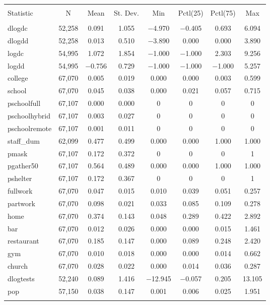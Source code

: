   \caption{} 
  \label{} 
\begin{tabular}{@{\extracolsep{5pt}}lccccccc} 
\\[-1.8ex]\hline 
\hline \\[-1.8ex] 
Statistic & \multicolumn{1}{c}{N} & \multicolumn{1}{c}{Mean} & \multicolumn{1}{c}{St. Dev.} & \multicolumn{1}{c}{Min} & \multicolumn{1}{c}{Pctl(25)} & \multicolumn{1}{c}{Pctl(75)} & \multicolumn{1}{c}{Max} \\ 
\hline \\[-1.8ex] 
dlogdc & 52,258 & 0.091 & 1.055 & $-$4.970 & $-$0.405 & 0.693 & 6.094 \\ 
dlogdd & 52,258 & 0.013 & 0.510 & $-$3.890 & 0.000 & 0.000 & 3.890 \\ 
logdc & 54,995 & 1.072 & 1.854 & $-$1.000 & $-$1.000 & 2.303 & 9.256 \\ 
logdd & 54,995 & $-$0.756 & 0.729 & $-$1.000 & $-$1.000 & $-$1.000 & 5.257 \\ 
college & 67,070 & 0.005 & 0.019 & 0.000 & 0.000 & 0.003 & 0.599 \\ 
school & 67,070 & 0.045 & 0.038 & 0.000 & 0.021 & 0.057 & 0.715 \\ 
pschoolfull & 67,107 & 0.000 & 0.000 & 0 & 0 & 0 & 0 \\ 
pschoolhybrid & 67,107 & 0.003 & 0.027 & 0 & 0 & 0 & 0 \\ 
pschoolremote & 67,107 & 0.001 & 0.011 & 0 & 0 & 0 & 0 \\ 
staff\_dum & 62,099 & 0.477 & 0.499 & 0.000 & 0.000 & 1.000 & 1.000 \\ 
pmask & 67,107 & 0.172 & 0.372 & 0 & 0 & 0 & 1 \\ 
pgather50 & 67,107 & 0.564 & 0.489 & 0.000 & 0.000 & 1.000 & 1.000 \\ 
pshelter & 67,107 & 0.172 & 0.367 & 0 & 0 & 0 & 1 \\ 
fullwork & 67,070 & 0.047 & 0.015 & 0.010 & 0.039 & 0.051 & 0.257 \\ 
partwork & 67,070 & 0.098 & 0.021 & 0.033 & 0.085 & 0.109 & 0.278 \\ 
home & 67,070 & 0.374 & 0.143 & 0.048 & 0.289 & 0.422 & 2.892 \\ 
bar & 67,070 & 0.012 & 0.026 & 0.000 & 0.000 & 0.015 & 1.461 \\ 
restaurant & 67,070 & 0.185 & 0.147 & 0.000 & 0.089 & 0.248 & 2.420 \\ 
gym & 67,070 & 0.010 & 0.018 & 0.000 & 0.000 & 0.014 & 0.662 \\ 
church & 67,070 & 0.028 & 0.022 & 0.000 & 0.014 & 0.036 & 0.287 \\ 
dlogtests & 52,240 & 0.089 & 1.416 & $-$12.945 & $-$0.057 & 0.205 & 13.105 \\ 
pop & 57,150 & 0.038 & 0.147 & 0.001 & 0.006 & 0.025 & 1.951 \\ 
\hline \\[-1.8ex] 
\end{tabular} 